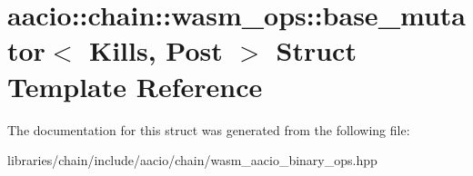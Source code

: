 \hypertarget{structaacio_1_1chain_1_1wasm__ops_1_1base__mutator}{}\section{aacio\+:\+:chain\+:\+:wasm\+\_\+ops\+:\+:base\+\_\+mutator$<$ Kills, Post $>$ Struct Template Reference}
\label{structaacio_1_1chain_1_1wasm__ops_1_1base__mutator}


The documentation for this struct was generated from the following file\+:\begin{DoxyCompactItemize}
\item 
libraries/chain/include/aacio/chain/wasm\+\_\+aacio\+\_\+binary\+\_\+ops.\+hpp\end{DoxyCompactItemize}
